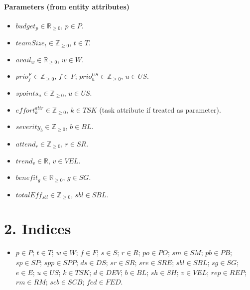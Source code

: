 \documentclass[11pt]{article}
\begin{document}
\paragraph{Parameters (from entity attributes)}
\begin{itemize}[leftmargin=2em,itemsep=0.2em]
  \item $budget_p\in\mathbb{R}_{\ge 0}$, $p\in P$.
  \item $teamSize_t\in\mathbb{Z}_{\ge 0}$, $t\in T$.
  \item $avail_w\in\mathbb{R}_{\ge 0}$, $w\in W$.
  \item $prio^F_f\in\mathbb{Z}_{\ge 0}$, $f\in F$; $prio^{US}_{u}\in\mathbb{Z}_{\ge 0}$, $u\in US$.
  \item $spoints_u\in\mathbb{Z}_{\ge 0}$, $u\in US$.
  \item $effort^{attr}_{k}\in\mathbb{Z}_{\ge 0}$, $k\in TSK$ (task attribute if treated as parameter).
  \item $severity_b\in\mathbb{Z}_{\ge 0}$, $b\in BL$.
  \item $attend_{r}\in\mathbb{Z}_{\ge 0}$, $r\in SR$.
  \item $trend_{v}\in\mathbb{R}$, $v\in VEL$.
  \item $benefit_{g}\in\mathbb{R}_{\ge 0}$, $g\in SG$.
  \item $totalEff_{sbl}\in\mathbb{Z}_{\ge 0}$, $sbl\in SBL$.
\end{itemize}

\section{2. Indices}
\begin{itemize}[leftmargin=2em]
  \item $p\in P$; $t\in T$; $w\in W$; $f\in F$; $s\in S$; $r\in R$; $po\in PO$; $sm\in SM$; $pb\in PB$; $sp\in SP$; $spp\in SPP$; $ds\in DS$; $sr\in SR$; $sre\in SRE$; $sbl\in SBL$; $sg\in SG$; $e\in E$; $u\in US$; $k\in TSK$; $d\in DEV$; $b\in BL$; $sh\in SH$; $v\in VEL$; $rep\in REP$; $rm\in RM$; $scb\in SCB$; $fed\in FED$.
\end{itemize}
\end{document}
